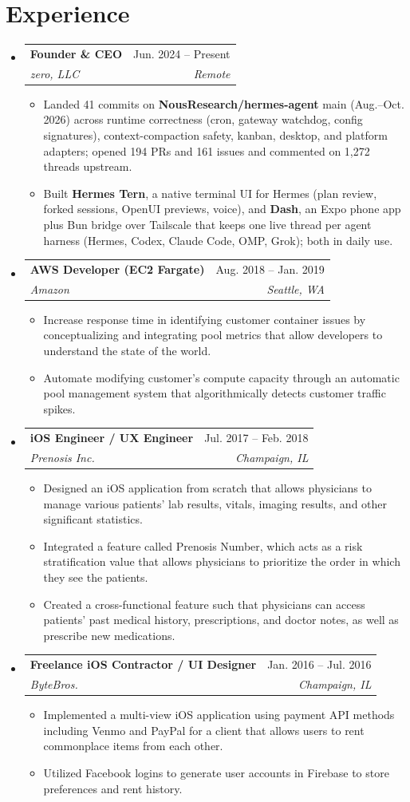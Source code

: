 \documentclass[letterpaper,11pt]{article}
\makeatletter
\newcommand{\resumeItem}[1]{\item\small{#1 \vspace{-2pt}}}
\newcommand{\resumeSubheading}[4]{%
  \vspace{-2pt}\item
    \begin{tabular*}{0.97\textwidth}[t]{l@{\extracolsep{\fill}}r}
      \textbf{#1} & #2 \\
      \textit{\small#3} & \textit{\small #4} \\
    \end{tabular*}\vspace{-7pt}
}
\newcommand{\resumeSubHeadingListStart}{\begin{itemize}[leftmargin=0.15in, label={}]}
\newcommand{\resumeSubHeadingListEnd}{\end{itemize}}
\newcommand{\resumeItemListStart}{\begin{itemize}}
\newcommand{\resumeItemListEnd}{\end{itemize}\vspace{-5pt}}
\makeatother
\begin{document}
\section{Experience}
  \resumeSubHeadingListStart
    \resumeSubheading
      {Founder \& CEO}{Jun. 2024 -- Present}
      {zero, LLC}{Remote}
      \resumeItemListStart
        \resumeItem{Landed 41 commits on \textbf{NousResearch/hermes-agent} main (Aug.--Oct. 2026) across runtime correctness (cron, gateway watchdog, config signatures), context-compaction safety, kanban, desktop, and platform adapters; opened 194 PRs and 161 issues and commented on 1,272 threads upstream.}
        \resumeItem{Built \textbf{Hermes Tern}, a native terminal UI for Hermes (plan review, forked sessions, OpenUI previews, voice), and \textbf{Dash}, an Expo phone app plus Bun bridge over Tailscale that keeps one live thread per agent harness (Hermes, Codex, Claude Code, OMP, Grok); both in daily use.}
      \resumeItemListEnd
    \resumeSubheading
      {AWS Developer (EC2 Fargate)}{Aug. 2018 -- Jan. 2019}
      {Amazon}{Seattle, WA}
      \resumeItemListStart
        \resumeItem{Increase response time in identifying customer container issues by conceptualizing and integrating pool metrics that allow developers to understand the state of the world.}
        \resumeItem{Automate modifying customer's compute capacity through an automatic pool management system that algorithmically detects customer traffic spikes.}
      \resumeItemListEnd
    \resumeSubheading
      {iOS Engineer / UX Engineer}{Jul. 2017 -- Feb. 2018}
      {Prenosis Inc.}{Champaign, IL}
      \resumeItemListStart
        \resumeItem{Designed an iOS application from scratch that allows physicians to manage various patients' lab results, vitals, imaging results, and other significant statistics.}
        \resumeItem{Integrated a feature called Prenosis Number, which acts as a risk stratification value that allows physicians to prioritize the order in which they see the patients.}
        \resumeItem{Created a cross-functional feature such that physicians can access patients' past medical history, prescriptions, and doctor notes, as well as prescribe new medications.}
      \resumeItemListEnd
    \resumeSubheading
      {Freelance iOS Contractor / UI Designer}{Jan. 2016 -- Jul. 2016}
      {ByteBros.}{Champaign, IL}
      \resumeItemListStart
        \resumeItem{Implemented a multi-view iOS application using payment API methods including Venmo and PayPal for a client that allows users to rent commonplace items from each other.}
        \resumeItem{Utilized Facebook logins to generate user accounts in Firebase to store preferences and rent history.}
      \resumeItemListEnd
  \resumeSubHeadingListEnd
\end{document}
